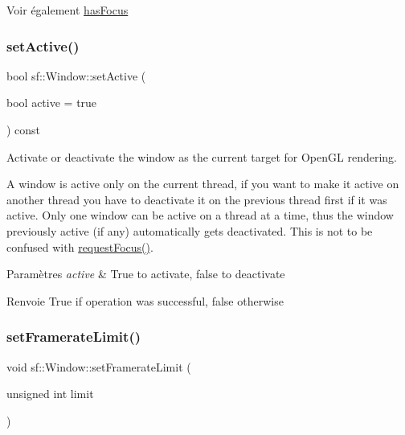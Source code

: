 \begin{DoxySeeAlso}{Voir également}
\hyperlink{classsf_1_1Window_ad8db2e6500d13ca9396281296404ba31}{has\+Focus} 
\end{DoxySeeAlso}
\mbox{\label{classsf_1_1Window_aaab549da64cedf74fa6f1ae7a3cc79e0}} 
\subsubsection{\texorpdfstring{set\+Active()}{setActive()}}
{\footnotesize\ttfamily bool sf\+::\+Window\+::set\+Active (\begin{DoxyParamCaption}\item[{bool}]{active = {\ttfamily true} }\end{DoxyParamCaption}) const}



Activate or deactivate the window as the current target for Open\+GL rendering. 

A window is active only on the current thread, if you want to make it active on another thread you have to deactivate it on the previous thread first if it was active. Only one window can be active on a thread at a time, thus the window previously active (if any) automatically gets deactivated. This is not to be confused with \hyperlink{classsf_1_1Window_a58cf7fa1775e8e7542032e3ecfa83b49}{request\+Focus()}.


\begin{DoxyParams}{Paramètres}
{\em active} & True to activate, false to deactivate\\
\hline
\end{DoxyParams}
\begin{DoxyReturn}{Renvoie}
True if operation was successful, false otherwise 
\end{DoxyReturn}
\mbox{\label{classsf_1_1Window_af4322d315baf93405bf0d5087ad5e784}} 
\subsubsection{\texorpdfstring{set\+Framerate\+Limit()}{setFramerateLimit()}}
{\footnotesize\ttfamily void sf\+::\+Window\+::set\+Framerate\+Limit (\begin{DoxyParamCaption}\item[{unsigned int}]{limit }\end{DoxyParamCaption})}



